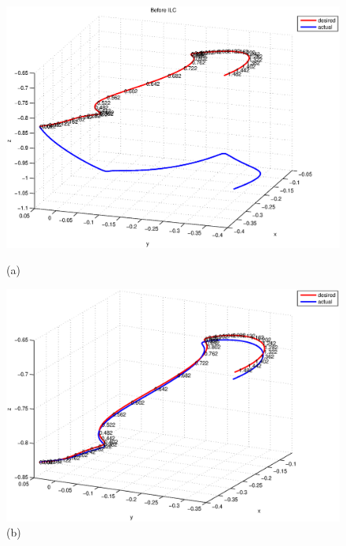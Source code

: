 \documentclass[10pt,a4paper]{article}
\theoremstyle{plain}
\theoremstyle{definition}
\begin{document}
%
\begin{figure}[!htb]
    \centering
    \begin{minipage}{.32\textwidth}
        \centering
        \includegraphics[width=\linewidth, height=0.15\textheight]{beforeILC.eps}
        \caption{(a)}
        \label{fig1}
    \end{minipage}%
    \begin{minipage}{.32\textwidth}
        \centering
        \includegraphics[width=\linewidth, height=0.15\textheight]{afterILCPseudoInv.eps}
        \caption{(b)}
        \label{fig2}
    \end{minipage}
    \begin{minipage}{.32\textwidth}
        \centering

\end{minipage}
\end{figure}
\end{document}

